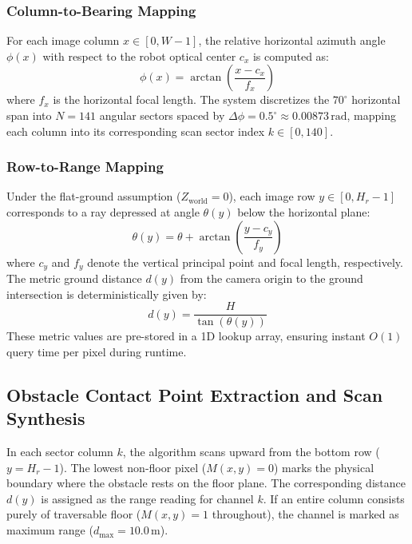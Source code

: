 \subsubsection{Column-to-Bearing Mapping}
For each image column $x \in [0, W-1]$, the relative horizontal azimuth angle $\phi(x)$ with respect to the robot optical center $c_x$ is computed as:
\begin{equation}
    \phi(x) = \arctan\left(\frac{x - c_x}{f_x}\right)
\end{equation}
where $f_x$ is the horizontal focal length. The system discretizes the $70^\circ$ horizontal span into $N = 141$ angular sectors spaced by $\Delta \phi = 0.5^\circ \approx 0.00873\,\text{rad}$, mapping each column into its corresponding scan sector index $k \in [0, 140]$.

\subsubsection{Row-to-Range Mapping}
Under the flat-ground assumption ($Z_{\text{world}} = 0$), each image row $y \in [0, H_r-1]$ corresponds to a ray depressed at angle $\theta(y)$ below the horizontal plane:
\begin{equation}
    \theta(y) = \theta + \arctan\left(\frac{y - c_y}{f_y}\right)
\end{equation}
where $c_y$ and $f_y$ denote the vertical principal point and focal length, respectively. The metric ground distance $d(y)$ from the camera origin to the ground intersection is deterministically given by:
\begin{equation}
    d(y) = \frac{H}{\tan(\theta(y))}
\end{equation}
These metric values are pre-stored in a 1D lookup array, ensuring instant $O(1)$ query time per pixel during runtime.

\subsection{Obstacle Contact Point Extraction and Scan Synthesis}
In each sector column $k$, the algorithm scans upward from the bottom row ($y = H_r - 1$). The lowest non-floor pixel ($M(x, y) = 0$) marks the physical boundary where the obstacle rests on the floor plane. The corresponding distance $d(y)$ is assigned as the range reading for channel $k$. If an entire column consists purely of traversable floor ($M(x, y) = 1$ throughout), the channel is marked as maximum range ($d_{\text{max}} = 10.0\,\text{m}$).

